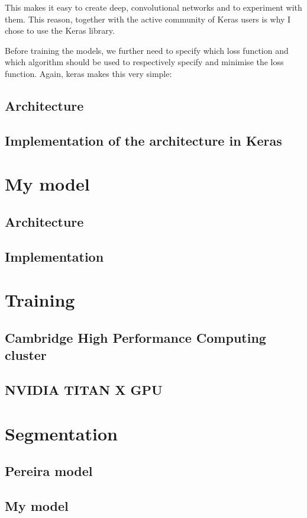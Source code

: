 \documentclass[12pt,a4paper,twoside,openright]{report}
\begin{document}
This makes it easy to create deep, convolutional networks and to experiment with them. This reason, together with the active community of Keras users is why I chose to use the Keras library.

Before training the models, we further need to specify which loss function and which algorithm should be used to respectively specify and minimise the loss function. Again, keras makes this very simple:


\subsection{Architecture}
\subsection{Implementation of the architecture in Keras}

\section{My model}
\subsection{Architecture}
\subsection{Implementation}
\section{Training}
\subsection{Cambridge High Performance Computing cluster}
\subsection{NVIDIA TITAN X GPU}

\section{Segmentation}
\subsection{Pereira model}
\subsection{My model}
\end{document}
